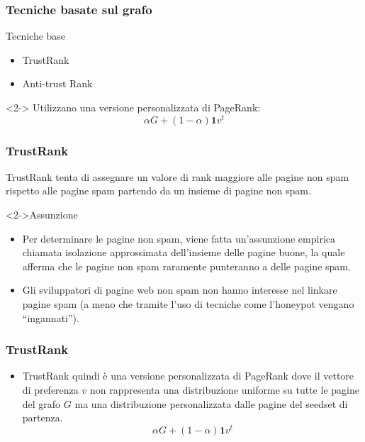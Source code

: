 \documentclass{beamer}
\begin{document}
\begin{frame}
  \frametitle{Tecniche basate sul grafo}
  \begin{block}{Tecniche base}
  \begin{itemize}
  \item TrustRank
  \item Anti-trust Rank
  \end{itemize}
  \end{block}
  \begin{block}<2->{}
  Utilizzano una versione personalizzata di PageRank:
  \begin{equation}
   \alpha G + (1-\alpha)\textbf{1}v^t
   \label{eqn:pagerank}
  \end{equation}
  \end{block}
  \end{frame}
\begin{frame}
  \frametitle{TrustRank}
  TrustRank tenta di assegnare un valore di rank maggiore alle pagine non spam rispetto alle pagine spam partendo da un insieme di pagine non spam.
  \begin{block}<2->{Assunzione}
  \begin{itemize}
   \item Per determinare le pagine non spam, viene fatta un’assunzione empirica chiamata isolazione approssimata dell’insieme delle pagine buone, la quale afferma che le pagine non spam raramente punteranno a delle pagine spam.
   \item Gli sviluppatori di pagine web non spam non hanno interesse nel linkare pagine spam (a meno che tramite l’uso di tecniche come l’honeypot vengano “ingannati”).
  \end{itemize}
  \end{block}
\end{frame}
\begin{frame}
  \frametitle{TrustRank}
  \begin{itemize}
   \item   TrustRank quindi è una versione personalizzata di PageRank dove il vettore di preferenza \(v\) non rappresenta una distribuzione uniforme su tutte le pagine del grafo \(G\) ma una distribuzione personalizzata dalle pagine del seedset di partenza.
$$
   \alpha G + (1-\alpha)\textbf{1}v^t
$$
  \end{itemize}
\end{frame}
\end{document}
